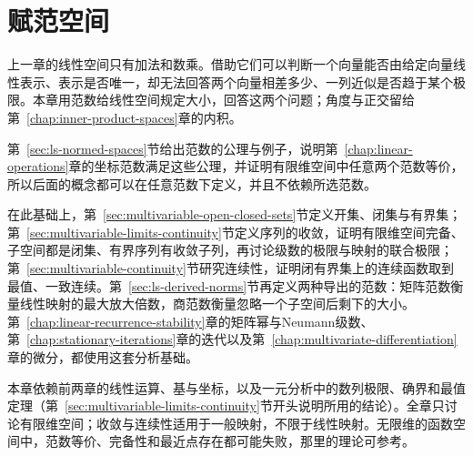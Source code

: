 \chapter{赋范空间}
\label{chap:normed-spaces}
\label{chap:normed-inner-product-spaces}

上一章的线性空间只有加法和数乘。借助它们可以判断一个向量能否由给定向量线性表示、表示是否唯一，却无法回答两个向量相差多少、一列近似是否趋于某个极限。本章用范数给线性空间规定大小，回答这两个问题；角度与正交留给第~\ref{chap:inner-product-spaces}章的内积。

第~\ref{sec:ls-normed-spaces}节给出范数的公理与例子，说明第~\ref{chap:linear-operations}章的坐标范数满足这些公理，并证明有限维空间中任意两个范数等价，所以后面的概念都可以在任意范数下定义，并且不依赖所选范数。

在此基础上，第~\ref{sec:multivariable-open-closed-sets}节定义开集、闭集与有界集；第~\ref{sec:multivariable-limits-continuity}节定义序列的收敛，证明有限维空间完备、子空间都是闭集、有界序列有收敛子列，再讨论级数的极限与映射的联合极限；第~\ref{sec:multivariable-continuity}节研究连续性，证明闭有界集上的连续函数取到最值、一致连续。第~\ref{sec:ls-derived-norms}节再定义两种导出的范数：矩阵范数衡量线性映射的最大放大倍数，商范数衡量忽略一个子空间后剩下的大小。第~\ref{chap:linear-recurrence-stability}章的矩阵幂与Neumann级数、第~\ref{chap:stationary-iterations}章的迭代以及第~\ref{chap:multivariate-differentiation}章的微分，都使用这套分析基础。

本章依赖前两章的线性运算、基与坐标，以及一元分析中的数列极限、确界和最值定理（第~\ref{sec:multivariable-limits-continuity}节开头说明所用的结论）。全章只讨论有限维空间；收敛与连续性适用于一般映射，不限于线性映射。无限维的函数空间中，范数等价、完备性和最近点存在都可能失败，那里的理论可参考。



